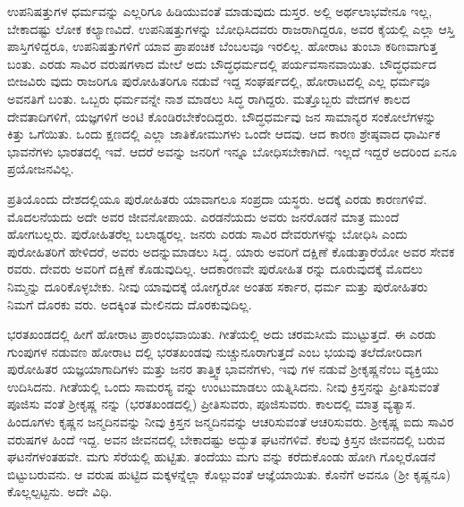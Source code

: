ಉಪನಿಷತ್ತುಗಳ ಧರ್ಮವನ್ನು ಎಲ್ಲರಿಗೂ ಹಿಡಿಯುವಂತೆ ಮಾಡುವುದು ದುಸ್ತರ. ಅಲ್ಲಿ ಅರ್ಥಲಾಭವೇನೂ ಇಲ್ಲ, ಬೇಕಾದಷ್ಟು ಲೋಕ ಕಲ್ಯಾಣವಿದೆ. ಉಪನಿಷತ್ತುಗಳನ್ನು ಬೋಧಿಸಿದವರು ರಾಜರಾಗಿದ್ದರೂ, ಅವರ ಕೈಯಲ್ಲಿ ಎಲ್ಲಾ ಆಸ್ತಿ ಪಾಸ್ತಿಗಳಿದ್ದರೂ, ಉಪನಿಷತ್ತುಗಳಿಗೆ ಯಾವ ಪ್ರಾಪಂಚಿಕ ಬೆಂಬಲವೂ ಇರಲಿಲ್ಲ. ಹೋರಾಟ ತುಂಬಾ ಕಠಿಣವಾಗುತ್ತ ಬಂತು. ಎರಡು ಸಾವಿರ ವರುಷಗಳಾದ ಮೇಲೆ ಅದು ಬೌದ್ಧಧರ್ಮದಲ್ಲಿ ಪರ್ಯವಸಾನವಾಯಿತು. ಬೌದ್ಧಧರ್ಮದ ಬೀಜವಿರು ವುದು ರಾಜರಿಗೂ ಪುರೋಹಿತರಿಗೂ ನಡುವೆ ಇದ್ದ ಸಂಘರ್ಷದಲ್ಲಿ, ಹೋರಾಟದಲ್ಲಿ ಎಲ್ಲ ಧರ್ಮವೂ ಅವನತಿಗೆ ಬಂತು. ಒಬ್ಬರು ಧರ್ಮವನ್ನೇ ನಾಶ ಮಾಡಲು ಸಿದ್ಧ ರಾಗಿದ್ದರು. ಮತ್ತೊಬ್ಬರು ವೇದಗಳ ಕಾಲದ ದೇವತಾದಿಗಳಿಗೆ, ಯಜ್ಞಗಳಿಗೆ ಅಂಟಿ ಕೊಂಡಿರಬೇಕೆಂದಿದ್ದರು. ಬೌದ್ಧಧರ್ಮವು ಜನ ಸಾಮಾನ್ಯರ ಸಂಕೋಲೆಗಳನ್ನು ಕಿತ್ತು ಒಗೆಯಿತು. ಒಂದು ಕ್ಷಣದಲ್ಲಿ ಎಲ್ಲಾ ಜಾತಿಕೋಮುಗಳು ಒಂದೇ ಆದವು. ಆದ ಕಾರಣ ಶ್ರೇಷ್ಠವಾದ ಧಾರ್ಮಿಕ ಭಾವನೆಗಳು ಭಾರತದಲ್ಲಿ ಇವೆ. ಆದರೆ ಅವನ್ನು ಜನರಿಗೆ ಇನ್ನೂ ಬೋಧಿಸಬೇಕಾಗಿದೆ. ಇಲ್ಲದೆ ಇದ್ದರೆ ಅದರಿಂದ ಏನೂ ಪ್ರಯೋಜನವಿಲ್ಲ.

ಪ್ರತಿಯೊಂದು ದೇಶದಲ್ಲಿಯೂ ಪುರೋಹಿತರು ಯಾವಾಗಲೂ ಸಂಪ್ರದಾ ಯಸ್ಥರು. ಅದಕ್ಕೆ ಎರಡು ಕಾರಣಗಳಿವೆ. ಮೊದಲನೆಯದು ಅದೇ ಅವರ ಜೀವನೋಪಾಯ. ಎರಡನೆಯದು ಅವರು ಜನರೊಡನೆ ಮಾತ್ರ ಮುಂದೆ ಹೋಗಬಲ್ಲರು. ಪುರೋಹಿತರೆಲ್ಲ ಬಲಾಢ್ಯರಲ್ಲ. ಜನರು ಎರಡು ಸಾವಿರ ದೇವರುಗಳನ್ನು ಬೋಧಿಸಿ ಎಂದು ಪುರೋಹಿತರಿಗೆ ಹೇಳಿದರೆ, ಅವರು ಅದನ್ನುಮಾಡಲು ಸಿದ್ಧ. ಯಾರು ಅವರಿಗೆ ದಕ್ಷಿಣೆ ಕೊಡುತ್ತಾರೆಯೋ ಅವರ ಸೇವಕ ರವರು. ದೇವರು ಅವರಿಗೆ ದಕ್ಷಿಣೆ ಕೊಡುವುದಿಲ್ಲ. ಆದಕಾರಣವೇ ಪುರೋಹಿತ ರನ್ನು ದೂರುವುದಕ್ಕೆ ಮೊದಲು ನಿಮ್ಮನ್ನು ದೂರಿಕೊಳ್ಳಬೇಕು. ನೀವು ಯಾವುದಕ್ಕೆ ಯೋಗ್ಯರೋ ಅಂತಹ ಸರ್ಕಾರ, ಧರ್ಮ ಮತ್ತು ಪುರೋಹಿತರು ನಿಮಗೆ ದೊರಕು ವರು. ಅದಕ್ಕಿಂತ ಮೇಲಿನದು ದೊರಕುವುದಿಲ್ಲ.

ಭರತಖಂಡದಲ್ಲಿ ಹೀಗೆ ಹೋರಾಟ ಪ್ರಾರಂಭವಾಯಿತು. ಗೀತೆಯಲ್ಲಿ ಅದು ಚರಮಸೀಮೆ ಮುಟ್ಟುತ್ತದೆ. ಈ ಎರಡು ಗುಂಪುಗಳ ನಡುವಣ ಹೋರಾಟ ದಲ್ಲಿ ಭರತಖಂಡವು ನುಚ್ಚುನೂರಾಗುತ್ತದೆ ಎಂಬ ಭಯವು ತಲೆದೋರಿದಾಗ ಪುರೋಹಿತರ ಯಜ್ಞಯಾಗಾದಿಗಳು ಮತ್ತು ಜನರ ತಾತ್ತ್ವಿಕ ಭಾವನೆಗಳು, ಇವು ಗಳ ನಡುವೆ ಶ‍್ರೀಕೃಷ್ಣನೆಂಬ ವ್ಯಕ್ತಿಯು ಉದಿಸಿದನು. ಗೀತೆಯಲ್ಲಿ ಒಂದು ಸಾಮರಸ್ಯ ವನ್ನು ಉಂಟುಮಾಡಲು ಯತ್ನಿಸಿದನು. ನೀವು ಕ್ರಿಸ್ತನನ್ನು ಪ್ರೀತಿಸುವಂತೆ ಪೂಜಿಸು ವಂತೆ ಶ‍್ರೀಕೃಷ್ಣ ನನ್ನು (ಭರತಖಂಡದಲ್ಲಿ) ಪ್ರೀತಿಸುವರು, ಪೂಜಿಸುವರು. ಕಾಲದಲ್ಲಿ ಮಾತ್ರ ವ್ಯತ್ಯಾಸ. ಹಿಂದೂಗಳು ಕೃಷ್ಣನ ಜನ್ಮದಿನವನ್ನು ನೀವು ಕ್ರಿಸ್ತನ ಜನ್ಮದಿನವನ್ನು ಆಚರಿಸುವಂತೆ ಆಚರಿಸುವರು. ಶ‍್ರೀಕೃಷ್ಣ ಐದು ಸಾವಿರ ವರುಷಗಳ ಹಿಂದೆ ಇದ್ದ. ಅವನ ಜೀವನದಲ್ಲಿ ಬೇಕಾದಷ್ಟು ಅದ್ಭುತ ಘಟನೆಗಳಿವೆ. ಕೆಲವು ಕ್ರಿಸ್ತನ ಜೀವನದಲ್ಲಿ ಬರುವ ಘಟನೆಗಳಂತಹವೇ. ಮಗು ಸೆರೆಯಲ್ಲಿ ಹುಟ್ಟಿತು. ತಂದೆಯು ಮಗು ವನ್ನು ಕರೆದುಕೊಂಡು ಹೋಗಿ ಗೊಲ್ಲರೊಡನೆ ಬಿಟ್ಟುಬರುವನು. ಆ ವರುಷ ಹುಟ್ಟಿದ ಮಕ್ಕಳನ್ನೆಲ್ಲಾ ಕೊಲ್ಲುವಂತೆ ಆಜ್ಞೆಯಾಯಿತು. ಕೊನೆಗೆ ಅವನೂ (ಶ‍್ರೀ ಕೃಷ್ಣನೂ) ಕೊಲ್ಲಲ್ಪಟ್ಟನು. ಅದೇ ವಿಧಿ.

